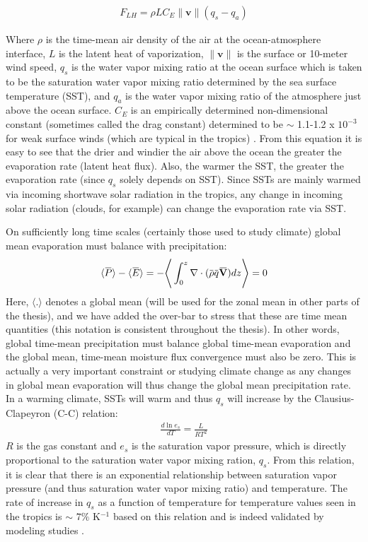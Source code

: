 \documentclass[letterpaper,12pt,titlepage,oneside,final]{book}
\newcommand{\norm}[1]{\lVert#1\rVert}
\newcommand{\overbar}[1]{\mkern 1.5mu\overline{\mkern-1.5mu#1\mkern-1.5mu}\mkern 1.5mu}
\begin{document}
\begin{align}
F_{LH}=\rho{L}C_{E}\norm{\textbf{v}}(q_{s}-q_{a})
\end{align}

Where $\rho$ is the time-mean air density of the air at the ocean-atmosphere interface, $L$ is the latent heat of vaporization, $\norm{\textbf{v}}$ is the surface or 10-meter wind speed, $q_{s}$ is the water vapor mixing ratio at the ocean surface which is taken to be the saturation water vapor mixing ratio determined by the sea surface temperature (SST), and $q_{a}$ is the water vapor mixing ratio of the atmosphere just above the ocean surface. $C_{E}$ is an empirically determined non-dimensional constant (sometimes called the drag constant) determined to be $\sim$ 1.1-1.2 x $10^{-3}$ for weak surface winds (which are typical in the tropics) \citep{katsaros_evaporation_2001}. From this equation it is easy to see that the drier and windier the air above the ocean the greater the evaporation rate (latent heat flux). Also, the warmer the SST, the greater the evaporation rate (since $q_{s}$ solely depends on SST). Since SSTs are mainly warmed via incoming shortwave solar radiation in the tropics, any change in incoming solar radiation (clouds, for example) can change the evaporation rate via SST. 

On sufficiently long time scales (certainly those used to study climate) global mean evaporation must balance with precipitation:
\begin{align}
\langle\overbar{P}\rangle-\langle\overbar{E}\rangle=-\Bigg\langle\int_{0}^{z}\mathbf{\nabla}\cdot(\overbar{\rho}{\overbar{q}}\overbar{\mathbf{V}})dz\Bigg\rangle=0
\end{align}
Here, $\langle{.}\rangle$ denotes a global mean (will be used for the zonal mean in other parts of the thesis), and we have added the over-bar to stress that these are time mean quantities (this notation is consistent throughout the thesis). In other words, global time-mean precipitation must balance global time-mean evaporation and the global mean, time-mean moisture flux convergence must also be zero. This is actually a very important constraint or studying climate change as any changes in global mean evaporation will thus change the global mean precipitation rate. In a warming climate, SSTs will warm and thus $q_{s}$ will increase by the Clausius-Clapeyron (C-C) relation:
\begin{align}
\frac{d\ln{e_{s}}}{dT}=\frac{L}{RT^{2}}
\end{align}
$R$ is the gas constant and $e_{s}$ is the saturation vapor pressure, which is directly proportional to the saturation water vapor mixing ration, $q_{s}$. From this relation, it is clear that there is an exponential relationship between saturation vapor pressure (and thus saturation water vapor mixing ratio) and temperature. The rate of increase in $q_s$ as a function of temperature for temperature values seen in the tropics is $\sim$ $7 \%$ K$^{-1}$ based on this relation and is indeed validated by modeling studies \citep{held_robust_2006,vecchi_weakening_2006}. 
\end{document}
